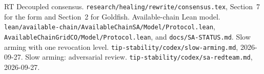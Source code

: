 \documentclass{article}
\theoremstyle{plain}
\theoremstyle{definition}
\theoremstyle{remark}
\begin{document}
\begin{thebibliography}{RT}
  Decoupled consensus.
  \nolinkurl{research/healing/rewrite/consensus.tex}, Section~7 for the
  form and Section~2 for Goldfish.
  Available-chain Lean model.
  \nolinkurl{lean/available-chain/AvailableChainSA/Model/Protocol.lean},
  \nolinkurl{AvailableChainGridCO/Model/Protocol.lean}, and
  \nolinkurl{docs/SA-STATUS.md}.
  Slow arming with one revocation level.
  \nolinkurl{tip-stability/codex/slow-arming.md}, 2026-09-27.
  Slow arming: adversarial review.
  \nolinkurl{tip-stability/codex/sa-redteam.md}, 2026-09-27.
\end{thebibliography}
\end{document}
